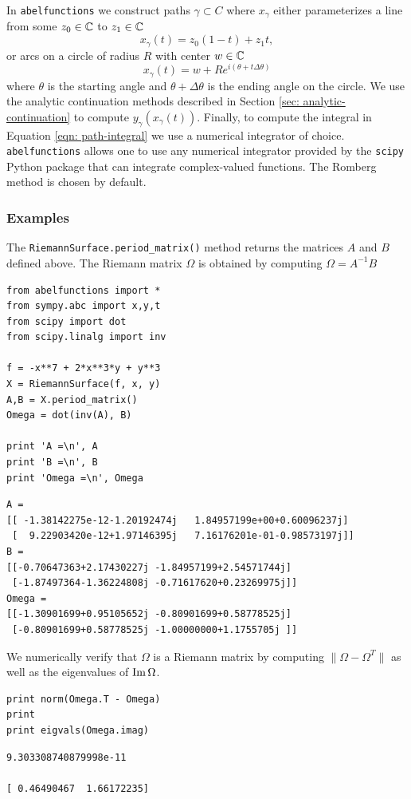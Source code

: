 In {\tt abelfunctions} we construct paths $\gamma \subset C$ where $x_\gamma$
either parameterizes a line from some $z_0\in\operatorname{\mathbb{C}}$ to $z_1\in\operatorname{\mathbb{C}}$
\[
  x_\gamma(t) = z_0(1-t) + z_1t,
\]
or arcs on a circle of radius $R$ with center $w\in\operatorname{\mathbb{C}}$
\[
  x_\gamma(t) = w + Re^{i(\theta + t \Delta \theta)}
\]
where $\theta$ is the starting angle and $\theta + \Delta \theta$ is the ending
angle on the circle. We use the analytic continuation methods described in
Section \ref{sec: analytic-continuation} to compute $y_\gamma(x_\gamma(t))$.
Finally, to compute the integral in Equation \eqref{eqn: path-integral} we use a
numerical integrator of choice. {\tt abelfunctions} allows one to use any
numerical integrator provided by the {\tt scipy} Python package that can
integrate complex-valued functions. The Romberg method \cite{wiki:Romberg} is
chosen by default.

%
\subsubsection*{Examples}
%

The \verb=RiemannSurface.period_matrix()= method returns the matrices $A$ and
$B$ defined above. The Riemann matrix $\Omega$ is obtained by computing $\Omega
= A^{-1}B$

\begin{lstlisting}
from abelfunctions import *
from sympy.abc import x,y,t
from scipy import dot
from scipy.linalg import inv

f = -x**7 + 2*x**3*y + y**3
X = RiemannSurface(f, x, y)
A,B = X.period_matrix()
Omega = dot(inv(A), B)

print 'A =\n', A
print 'B =\n', B
print 'Omega =\n', Omega
\end{lstlisting}
\begin{lstlisting}
A =
[[ -1.38142275e-12-1.20192474j   1.84957199e+00+0.60096237j]
 [  9.22903420e-12+1.97146395j   7.16176201e-01-0.98573197j]]
B =
[[-0.70647363+2.17430227j -1.84957199+2.54571744j]
 [-1.87497364-1.36224808j -0.71617620+0.23269975j]]
Omega =
[[-1.30901699+0.95105652j -0.80901699+0.58778525j]
 [-0.80901699+0.58778525j -1.00000000+1.1755705j ]]
\end{lstlisting}
We numerically verify that $\Omega$ is a Riemann matrix by computing $\|\Omega -
\Omega^T\|$ as well as the eigenvalues of $\operatorname{\text{Im}} \Omega$.
\begin{lstlisting}[firstnumber=14]
print norm(Omega.T - Omega)
print
print eigvals(Omega.imag)
\end{lstlisting}
\begin{lstlisting}
9.303308740879998e-11

[ 0.46490467  1.66172235]
\end{lstlisting}


